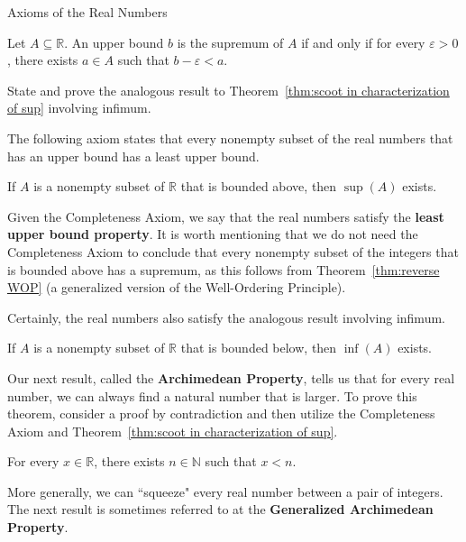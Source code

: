 \begin{section}{Axioms of the Real Numbers}
\begin{theorem}\label{thm:scoot in characterization of sup}
Let $A\subseteq \mathbb{R}$. An upper bound $b$ is the supremum of $A$ if and only if for every $\varepsilon >0$, there exists $a\in A$ such that $b-\varepsilon <a$.
\end{theorem}

\begin{problem}
State and prove the analogous result to Theorem~\ref{thm:scoot in characterization of sup} involving infimum.
\end{problem}

The following axiom states that every nonempty subset of the real numbers that has an upper bound has a least upper bound.

\begin{axiom}\label{axiom:completeness}
If $A$ is a nonempty subset of $\mathbb{R}$ that is bounded above, then $\sup(A)$ exists.
\end{axiom}

Given the Completeness Axiom, we say that the real numbers satisfy the \textbf{least upper bound property}. It is worth mentioning that we do not need the Completeness Axiom to conclude that every nonempty subset of the integers that is bounded above has a supremum, as this follows from Theorem~\ref{thm:reverse WOP} (a generalized version of the Well-Ordering Principle). 

Certainly, the real numbers also satisfy the analogous result involving infimum.

\begin{theorem}
If $A$ is a nonempty subset of $\mathbb{R}$ that is bounded below, then $\inf(A)$ exists.
\end{theorem}

Our next result, called the \textbf{Archimedean Property}, tells us that for every real number, we can always find a natural number that is larger. To prove this theorem, consider a proof by contradiction and then utilize the Completeness Axiom and Theorem~\ref{thm:scoot in characterization of sup}.

\begin{theorem}
For every $x\in\mathbb{R}$, there exists $n\in\mathbb{N}$ such that $x<n$.
\end{theorem}

More generally, we can ``squeeze" every real number between a pair of integers. The next result is sometimes referred to at the \textbf{Generalized Archimedean Property}.


\end{section}
